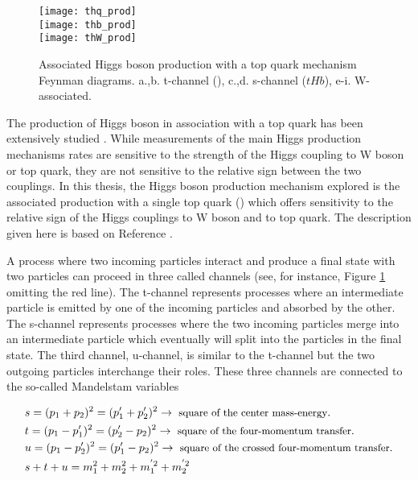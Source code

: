 \begin{figure}[h!]
\centering
\texttt{[image: thq\_prod]}\\
\texttt{[image: thb\_prod]}\\
\texttt{[image: thW\_prod]}\\
\caption[Higgs boson production in association with a top quark]{Associated Higgs boson production with a top quark mechanism Feynman diagrams. a.,b. t-channel (\tHq), c.,d. s-channel ($tHb$), e-i. W-associated.}
\label{fig:th_prod}
\end{figure}

The production of Higgs boson in association with a top quark has been extensively studied \cite{maltoni1, biswas, farina,tait, maltoni2}. While measurements of the main Higgs production mechanisms rates are sensitive to the strength of the Higgs coupling to W boson or top quark, they are not sensitive to the relative sign between the two couplings. In this thesis, the Higgs boson production mechanism explored is the associated production with a single top quark (\tH) which offers sensitivity to the relative sign of the Higgs couplings to W boson and to top quark. The description given here is based on Reference \cite{farina}.

A process where two incoming particles interact and produce a final state with two particles can proceed in three called channels (see, for instance, Figure \ref{fig:th_prod} omitting the red line). The t-channel represents processes where an intermediate particle is emitted by one of the incoming particles and absorbed by the other. The s-channel represents processes where the two incoming particles merge into an intermediate particle which eventually will split into the particles in the final state. The third channel, u-channel, is similar to the t-channel but the two outgoing particles interchange their roles. These three channels are connected to the so-called Mandelstam variables 

\begin{align}
&s =(p_1 +p_2)^2 =(p_1' + p_2')^2 \to{\small \textrm{ square of the center mass-energy}}.\\
&t =(p_1 -p_1')^2 =(p_2' -p_2)^2 \to{\small \textrm{ square of the four-momentum transfer}}.\\
&u =(p_1 -p_2')^2 =(p_1' - p_2)^2 \to{\small \textrm{ square of the crossed four-momentum transfer}}.\\
&s+t+u = m_1^2 + m_2^2 + m_1^{'2} +  m_2^{'2}
\end{align}

